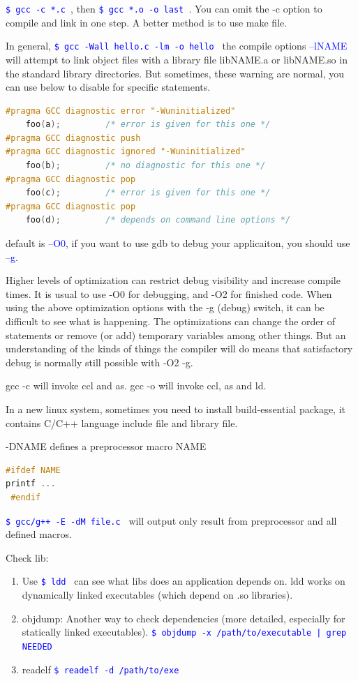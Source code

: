 \documentclass[paper=8.5in:11in, twoside, 12pt, pagesize=pdftex]{book}
\newcommand{\linuxcommand}[1]{\texttt{\textcolor{blue}{\$ #1 \Pisymbol{psy}{191}}}}
\newcommand{\op}[1]{\textcolor{blue}{-#1}}
\begin{document}
   \linuxcommand{gcc -c *.c}, then \linuxcommand{gcc *.o -o last}. You can omit the -c option to compile and link in one step. A better method is to use make file.

   In general, \linuxcommand{gcc -Wall hello.c -lm -o hello} the compile options \op{-lNAME} will attempt to link object files with a library file libNAME.a or libNAME.so in the standard library directories. But sometimes, these warning are normal, you can use below to disable for specific statements.

\begin{lstlisting}[frame=single, language=c++]
#pragma GCC diagnostic error "-Wuninitialized"
    foo(a);         /* error is given for this one */
#pragma GCC diagnostic push
#pragma GCC diagnostic ignored "-Wuninitialized"
    foo(b);         /* no diagnostic for this one */
#pragma GCC diagnostic pop
    foo(c);         /* error is given for this one */
#pragma GCC diagnostic pop
    foo(d);         /* depends on command line options */
\end{lstlisting}

default is \op{-O0}, if you want to use gdb to debug your applicaiton, you should use \op{-g}.

 Higher levels of optimization can restrict debug visibility and increase compile times. It is usual to use -O0 for debugging, and -O2 for finished code. When using the above optimization options with the -g (debug) switch, it can be difficult to see what is happening. The optimizations can change the order of statements or remove (or add) temporary variables among other things. But an understanding of the kinds of things the compiler will do means that satisfactory debug is normally still possible with -O2 -g.

 gcc -c will invoke ccl and as. gcc -o will invoke ccl, as and ld.

	In a new linux system, sometimes you need to install build-essential package,  it contains C/C++ language include file and library file.

-DNAME defines a preprocessor macro NAME
 
\begin{lstlisting}[frame=single, language=c++]
#ifdef NAME
printf ...
 #endif
\end{lstlisting}

    \linuxcommand{gcc/g++ -E -dM file.c} will output only result from preprocessor and all defined macros.
    
    Check lib:
  \begin{enumerate}
  	\item Use \linuxcommand{ldd} can see what libs does an application depends on. ldd works on dynamically linked executables (which depend on .so libraries).
  	
  	\item objdump: Another way to check dependencies (more detailed, especially for statically linked executables).
  	\linuxcommand{objdump -x /path/to/executable | grep NEEDED}
  	
  	\item readelf \linuxcommand{readelf -d /path/to/exe} 
  \end{enumerate} 
    
\end{document}
